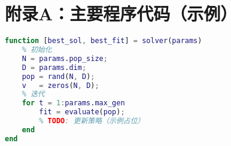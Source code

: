 \chapter{附录A：主要程序代码（示例）}
\begin{lstlisting}[language=Matlab,caption={示例：算法主函数框架}]
function [best_sol, best_fit] = solver(params)
    % 初始化
    N = params.pop_size;
    D = params.dim;
    pop = rand(N, D);
    v   = zeros(N, D);
    % 迭代
    for t = 1:params.max_gen
        fit = evaluate(pop);
        % TODO: 更新策略（示例占位）
    end
end
\end{lstlisting}

